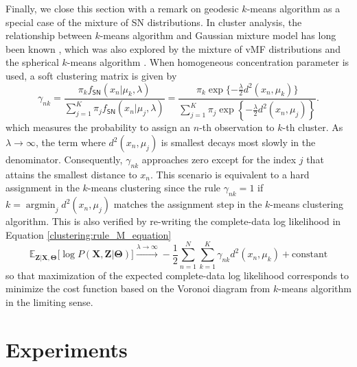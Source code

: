 \documentclass[11pt]{article}
\DeclareMathOperator*{\argmin}{argmin}
\newcommand{\bbE}{\mathbb{E}}
\newcommand{\bfX}{\mathbf{X}}
\newcommand{\bfZ}{\mathbf{Z}}
\newcommand{\bfTheta}{\mathbf{\Theta}}
\begin{document}
Finally, we close this section with a remark on geodesic $k$-means algorithm as a special case of the mixture of SN distributions. In cluster analysis, the relationship between $k$-means algorithm and Gaussian mixture model has long been known \citep{bishop_pattern_2006}, which was also explored by the mixture of vMF distributions \citep{banerjee_clustering_2005} and the spherical $k$-means algorithm \citep{dhillon_concept_2001}. When homogeneous concentration parameter is used, a soft clustering matrix is given by 
\begin{equation}
\gamma_{nk} = \frac{\pi_k f_\textsf{SN}(x_n | \mu_k, \lambda)}{\sum_{j=1}^K \pi_j f_\textsf{SN}(x_n | \mu_j, \lambda)} = \frac{\pi_k \exp \lbrace -\frac{\lambda}{2} d^2 (x_n, \mu_k) \rbrace}{\sum_{j=1}^K \pi_j \exp \left\lbrace -\frac{\lambda}{2} d^2 (x_n, \mu_j) \right\rbrace}.
\end{equation}
which measures the probability to assign an $n$-th observation to $k$-th cluster. As $\lambda \rightarrow \infty$, the term where $d^2 (x_n, \mu_j)$ is smallest decays most slowly in the denominator. Consequently, $\gamma_{nk}$ approaches zero except for the index $j$ that attains the smallest distance to $x_n$. This scenario is equivalent to a hard assignment in the $k$-means clustering since the rule $\gamma_{nk} = 1$ if $k = \argmin_j d^2(x_n, \mu_j)$ matches the assignment step in the $k$-means clustering algorithm. This is also verified by re-writing the complete-data log likelihood in Equation \eqref{clustering:rule_M_equation} 
\begin{equation*}
\bbE_{\bfZ|\bfX,\bfTheta } \lbrack \log P(\bfX, \bfZ | \bfTheta) \rbrack \xrightarrow{\lambda \rightarrow \infty} -\frac{1}{2} \sum_{n=1}^N \sum_{k=1}^K \gamma_{nk} d^2(x_n, \mu_k) + \textrm{constant}
\end{equation*}
so that maximization of the expected complete-data log likelihood corresponds to minimize the cost function based on the Voronoi diagram from $k$-means algorithm in the limiting sense. 


\section{Experiments}\label{sec:experiment}
\end{document}
